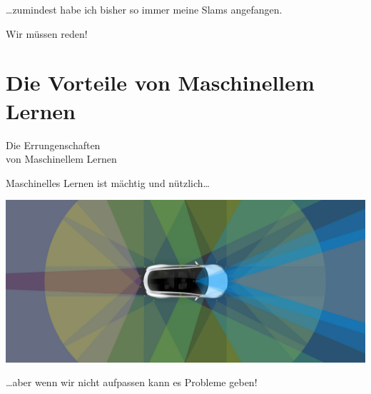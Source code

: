 \documentclass[aspectratio=43,x11names]{beamer}
\begin{document}

\begin{frame}

\begin{center}
\dots zumindest habe ich bisher so immer meine Slams angefangen.
\bigskip

Wir müssen reden!
\end{center}

\end{frame}

\section{Die Vorteile von Maschinellem Lernen}

\begin{frame}
\begin{center}
\huge
Die Errungenschaften\\von Maschinellem Lernen
\end{center}
\end{frame}

\begin{frame}

\begin{center}
Maschinelles Lernen ist mächtig und nützlich\dots
\end{center}

\begin{center}
\includegraphics[width=\textwidth]{images/autopilotnew.jpg} 
\end{center}

\begin{center}
\dots aber wenn wir nicht aufpassen kann es Probleme geben!
\end{center}
\end{frame}

\end{document}
